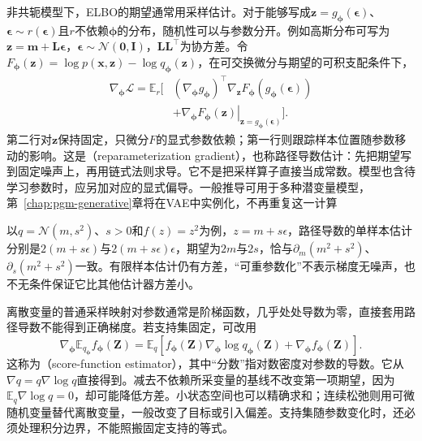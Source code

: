 非共轭模型下，ELBO的期望通常用采样估计。对于能够写成$\bm z=g_{\bm{\phi}}(\bm\epsilon)$、$\bm\epsilon\sim r(\bm\epsilon)$且$r$不依赖$\bm{\phi}$的分布，随机性可以与参数分开。例如高斯分布可写为$\bm z=\bm m+\bm L\bm\epsilon$，$\bm\epsilon\sim\mathcal N(\bm0,\bm I)$，$\bm L\bm L^\top$为协方差。令$F_{\bm{\phi}}(\bm z)=\log p(\bm x,\bm z)-\log q_{\bm{\phi}}(\bm z)$，在可交换微分与期望的可积支配条件下，
\begin{equation}
  \begin{aligned}
    \nabla_{\bm{\phi}}\mathcal L
      =\mathbb E_r\big[
        &(\nabla_{\bm{\phi}}g_{\bm{\phi}})^\top
           \nabla_{\bm z}F_{\bm{\phi}}
                (g_{\bm{\phi}}(\bm\epsilon))\\
        &+\left.\nabla_{\bm{\phi}}F_{\bm{\phi}}(\bm z)
          \right|_{\bm z=g_{\bm{\phi}}(\bm\epsilon)}
        \big].
  \end{aligned}
  \label{eq:pgm-variational-pathwise}
\end{equation}
第二行对$\bm z$保持固定，只微分$F$的显式参数依赖；第一行则跟踪样本位置随参数移动的影响。这是（reparameterization gradient），也称路径导数估计：先把期望写到固定噪声上，再用链式法则求导。它不是把采样算子直接当成常数。模型也含待学习参数时，应另加对应的显式偏导。一般推导可用于多种潜变量模型，第~\ref{chap:pgm-generative}章将在VAE中实例化，不再重复这一计算

以$q=\mathcal N(m,s^2)$、$s>0$和$f(z)=z^2$为例，$z=m+s\epsilon$，路径导数的单样本估计分别是$2(m+s\epsilon)$与$2(m+s\epsilon)\epsilon$，期望为$2m$与$2s$，恰与$\partial_m(m^2+s^2)$、$\partial_s(m^2+s^2)$一致。有限样本估计仍有方差，“可重参数化”不表示梯度无噪声，也不无条件保证它比其他估计器方差小。

离散变量的普通采样映射对参数通常是阶梯函数，几乎处处导数为零，直接套用路径导数不能得到正确梯度。若支持集固定，可改用
\begin{equation}
  \nabla_{\bm{\phi}}\mathbb E_{q_{\bm{\phi}}}f_{\bm{\phi}}(\bm Z)
    =\mathbb E_q\!\left[
       f_{\bm{\phi}}(\bm Z)\nabla_{\bm{\phi}}\log q_{\bm{\phi}}(\bm Z)
       +\nabla_{\bm{\phi}}f_{\bm{\phi}}(\bm Z)\right].
  \label{eq:pgm-variational-score-function}
\end{equation}
这称为（score-function estimator），其中“分数”指对数密度对参数的导数。它从$\nabla q=q\nabla\log q$直接得到。减去不依赖所采变量的基线不改变第一项期望，因为$\mathbb E_q\nabla\log q=0$，却可能降低方差。小状态空间也可以精确求和；连续松弛则用可微随机变量替代离散变量，一般改变了目标或引入偏差。支持集随参数变化时，还必须处理积分边界，不能照搬固定支持的等式。

